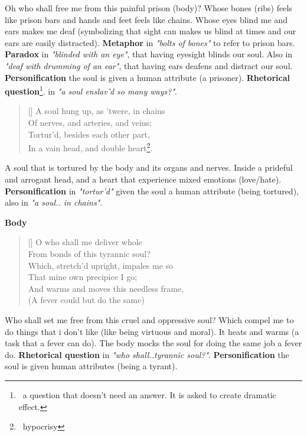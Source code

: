Oh who shall free me from this painful prison (body)?
Whose bones (ribs) feels like prison bars and hands
and feet feels like chains. Whose eyes blind me 
and ears makes me deaf (symbolizing that sight can 
makes us blind at times and our ears are easily distracted). 
\textbf{Metaphor} in \textit{"bolts of bones"} to refer to prison bars. 
\textbf{Paradox} in \textit{"blinded with an eye"}, that
having eyesight blinds our soul. Also in \textit{"deaf with
drumming of an ear"}, that having ears deafens and distract our
soul. \textbf{Personification} the soul is given a human attribute
(a prisoner). \textbf{Rhetorical question}\footnote{\, 
a question that doesn't need an answer. It is asked to create dramatic effect.}.
in \textit{"a soul enslav’d so many ways?"}.

\begin{verse}[\versewidth]
{\fontverse
A soul hung up, as ’twere, in chains\\
Of nerves, and arteries, and veins;\\
Tortur’d, besides each other part,\\
In a vain head, and double heart\footnote{\, hypocrisy}. 
} 
\end{verse}

A soul that is tortured by the body and its organs and nerves.
Inside a prideful and arrogant head, and a heart that experience
mixed emotions (love/hate). \textbf{Personification} in \textit{"tortur'd"} 
given the soul a human attribute (being tortured), also in \textit{"a soul.. in chains"}.\bigbreak

\newpage
\centerline{\textbf{\large{Body}}}
\begin{verse}[\versewidth]
{\fontverse
O who shall me deliver whole\\
From bonds of this tyrannic soul?\\
Which, stretch’d upright, impales me so\\
That mine own precipice I go;\\
And warms and moves this needless frame,\\
(A fever could but do the same)
} 
\end{verse}

Who shall set me free from this cruel and oppressive soul? Which compel 
me to do things that i don't like (like being virtuous and moral). It 
heats and warms (a task that a fever can do). The body mocks the soul 
for doing the same job a fever do. \textbf{Rhetorical question} in
\textit{"who shall..tyrannic soul?"}. \textbf{Personification} the soul
is given human attributes (being a tyrant). 

